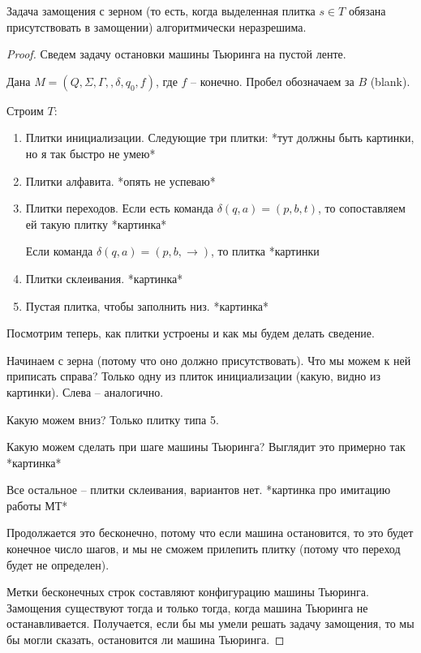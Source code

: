 \begin{thm}
    Задача замощения с зерном (то есть, когда выделенная плитка $ s \in T $ обязана присутствовать в замощении) алгоритмически неразрешима.
\end{thm}
\begin{proof}
    Сведем задачу остановки машины Тьюринга на пустой ленте.

    Дана $ M = (Q, \Sigma, \Gamma, , \delta, q_0, f)$, где $ f $ -- конечно. Пробел обозначаем за $B$ (blank).

    Строим $T$:
    \begin{enumerate}
        \item Плитки инициализации. Следующие три плитки: *тут должны быть картинки, но я так быстро не умею*

        \item Плитки алфавита. *опять не успеваю*

        \item Плитки переходов. Если есть команда $ \delta(q, a) = (p, b, t) $, то сопоставляем
            ей такую плитку *картинка*

            Если команда $ \delta(q, a) = (p, b, \rightarrow) $, то плитка *картинки

        \item Плитки склеивания. *картинка*

        \item Пустая плитка, чтобы заполнить низ. *картинка*
    \end{enumerate}

    Посмотрим теперь, как плитки устроены и как мы будем делать сведение.

    Начинаем с зерна (потому что оно должно присутствовать). Что мы можем к ней приписать справа?
    Только одну из плиток инициализации (какую, видно из картинки). Слева -- аналогично.

    Какую можем вниз? Только плитку типа 5.

    Какую можем сделать при шаге машины Тьюринга? Выглядит это примерно так *картинка*

    Все остальное -- плитки склеивания, вариантов нет.
    *картинка про имитацию работы МТ*

    Продолжается это бесконечно, потому что если машина остановится, то это будет конечное число
    шагов, и мы не сможем прилепить плитку (потому что переход будет не определен).

    Метки бесконечных строк составляют конфигурацию машины Тьюринга. Замощения существуют тогда и только тогда, когда машина Тьюринга не останавливается. Получается, если бы мы умели решать задачу замощения, то мы бы могли сказать, остановится ли машина Тьюринга.
\end{proof}

